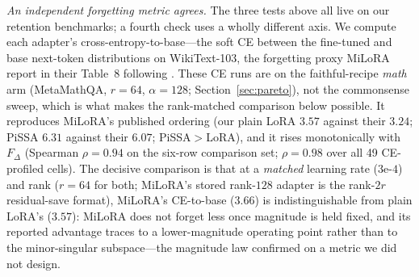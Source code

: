 \documentclass[11pt]{article}
\newcommand{\dw}{F_{\Delta}}
\begin{document}
\emph{An independent forgetting metric agrees.} The three tests above all live on
our retention benchmarks; a fourth check uses a wholly different axis. We compute
each adapter's cross-entropy-to-base---the soft CE between the fine-tuned and base
next-token distributions on WikiText-103, the forgetting proxy MiLoRA report in
their Table~8 following \citet{kalajdzievski2024scaling}. These CE runs are on the
faithful-recipe \emph{math} arm (MetaMathQA, $r\!=\!64$, $\alpha\!=\!128$;
Section~\ref{sec:pareto}), not the commonsense sweep, which is what makes the
rank-matched comparison below possible. It reproduces MiLoRA's
published ordering (our plain LoRA $3.57$ against their $3.24$; PiSSA $6.31$ against
their $6.07$; PiSSA${>}$LoRA), and it rises monotonically with $\dw$ (Spearman
$\rho\!=\!0.94$ on the six-row comparison set; $\rho\!=\!0.98$ over all 49
CE-profiled cells). The decisive comparison is that at a \emph{matched} learning rate
($3\text{e-}4$) and rank ($r\!=\!64$ for both; MiLoRA's stored rank-$128$ adapter
is the rank-$2r$ residual-save format), MiLoRA's CE-to-base ($3.66$) is
indistinguishable from
plain LoRA's ($3.57$): MiLoRA does not forget less once magnitude is held fixed, and
its reported advantage traces to a lower-magnitude operating point rather than to the
minor-singular subspace---the magnitude law confirmed on a metric we did not design.
\end{document}
